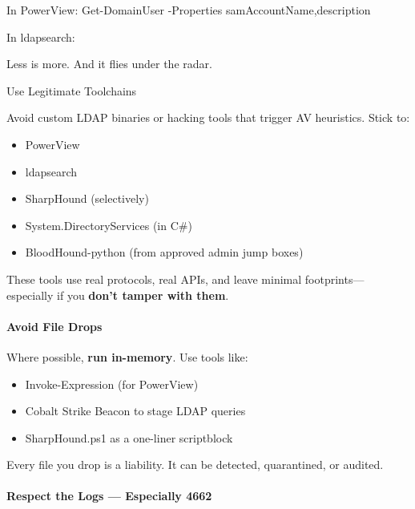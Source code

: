 In PowerView:
Get-DomainUser -Properties samAccountName,description

In ldapsearch:


Less is more. And it flies under the radar.

Use Legitimate Toolchains

Avoid custom LDAP binaries or hacking tools that trigger AV heuristics. Stick to:

\begin{itemize}
    \item PowerView

    \item ldapsearch

    \item SharpHound (selectively)

    \item System.DirectoryServices (in C\#)

    \item BloodHound-python (from approved admin jump boxes)

\end{itemize}
These tools use real protocols, real APIs, and leave minimal footprints—especially if you \textbf{don’t tamper with them}.

\paragraph{\textbf{   Avoid File Drops}}

Where possible, \textbf{run in-memory}. Use tools like:

\begin{itemize}
    \item Invoke-Expression (for PowerView)

    \item Cobalt Strike Beacon to stage LDAP queries

    \item SharpHound.ps1 as a one-liner scriptblock

\end{itemize}
Every file you drop is a liability. It can be detected, quarantined, or audited.

\paragraph{\textbf{   Respect the Logs — Especially 4662}}

